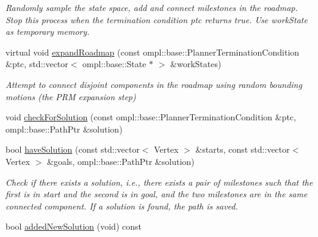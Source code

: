 \begin{DoxyCompactItemize}
\begin{DoxyCompactList}\small\item\em \-Randomly sample the state space, add and connect milestones in the roadmap. \-Stop this process when the termination condition {\itshape ptc\/} returns true. \-Use {\itshape work\-State\/} as temporary memory. \end{DoxyCompactList}\item 
\hypertarget{class_f_i_r_m_ab0c4511064a0cd59f5b5ad756879c4ef}{virtual void \hyperlink{class_f_i_r_m_ab0c4511064a0cd59f5b5ad756879c4ef}{expand\-Roadmap} (const ompl\-::base\-::\-Planner\-Termination\-Condition \&ptc, std\-::vector$<$ ompl\-::base\-::\-State $\ast$ $>$ \&work\-States)}\label{class_f_i_r_m_ab0c4511064a0cd59f5b5ad756879c4ef}

\begin{DoxyCompactList}\small\item\em \-Attempt to connect disjoint components in the roadmap using random bounding motions (the \-P\-R\-M expansion step) \end{DoxyCompactList}\item 
void \hyperlink{class_f_i_r_m_a4c909fc53ceeeecb6992ccebf0ab60d6}{check\-For\-Solution} (const ompl\-::base\-::\-Planner\-Termination\-Condition \&ptc, ompl\-::base\-::\-Path\-Ptr \&solution)
\item 
\hypertarget{class_f_i_r_m_ab237fb0d7978ef4156769fc7c1d77b2b}{bool \hyperlink{class_f_i_r_m_ab237fb0d7978ef4156769fc7c1d77b2b}{have\-Solution} (const std\-::vector$<$ \-Vertex $>$ \&starts, const std\-::vector$<$ \-Vertex $>$ \&goals, ompl\-::base\-::\-Path\-Ptr \&solution)}\label{class_f_i_r_m_ab237fb0d7978ef4156769fc7c1d77b2b}

\begin{DoxyCompactList}\small\item\em \-Check if there exists a solution, i.\-e., there exists a pair of milestones such that the first is in {\itshape start\/} and the second is in {\itshape goal\/}, and the two milestones are in the same connected component. \-If a solution is found, the path is saved. \end{DoxyCompactList}\item 
\hypertarget{class_f_i_r_m_a341a81deb4e550fbacf6c239a801d2a8}{bool \hyperlink{class_f_i_r_m_a341a81deb4e550fbacf6c239a801d2a8}{added\-New\-Solution} (void) const }\label{class_f_i_r_m_a341a81deb4e550fbacf6c239a801d2a8}


\end{DoxyCompactItemize}
